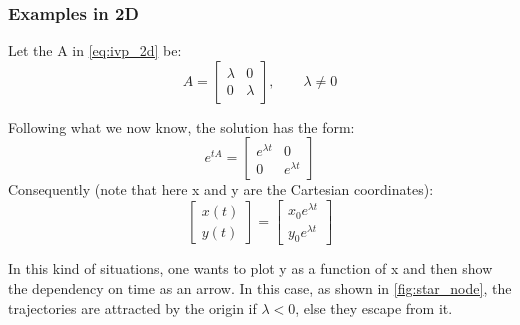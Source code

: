 \subsubsection{Examples in 2D}
\begin{example}
    Let the A in \autoref{eq:ivp_2d} be:
    \begin{equation*}
        A= \begin{bmatrix}
            \lambda & 0 \\
            0 & \lambda
        \end{bmatrix}, \qquad \lambda\neq0
    \end{equation*}

    Following what we now know, the solution has the form:
    \begin{equation*}
        e^{tA}=\begin{bmatrix}
            e^{\lambda t} & 0 \\
            0 & e^{\lambda t}
        \end{bmatrix}
    \end{equation*}
    Consequently (note that here x and y are the Cartesian coordinates):
    \begin{equation*}
        \begin{bmatrix}
            x(t) \\ y(t)
        \end{bmatrix}=\begin{bmatrix}
            x_0e^{\lambda t} \\ y_0e^{\lambda t}
        \end{bmatrix}
    \end{equation*}

    In this kind of situations, one wants to plot y as a function of x and then show the dependency on time as an arrow. In this case, as shown in \autoref{fig:star_node}, the trajectories are attracted by the origin if $\lambda<0$, else they escape from it.

    \begin{figure}[ht]
    \centering


\end{figure}
\end{example}
